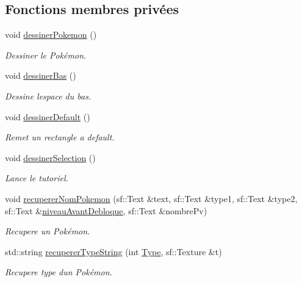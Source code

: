 \subsection*{Fonctions membres privées}
\begin{DoxyCompactItemize}
\item 
void \hyperlink{class_s_f_m_l_pokedex_a7693d7d78e637f1839f0459985cb59e3}{dessiner\+Pokemon} ()
\begin{DoxyCompactList}\small\item\em Dessiner le Pokémon. \end{DoxyCompactList}\item 
void \hyperlink{class_s_f_m_l_pokedex_a9760b492343dc3c07d49ec86f2160a95}{dessiner\+Bas} ()
\begin{DoxyCompactList}\small\item\em Dessine l\textquotesingle{}espace du bas. \end{DoxyCompactList}\item 
void \hyperlink{class_s_f_m_l_pokedex_ae5f87a7a8a5cb0e6d151f15646d7e4af}{dessiner\+Default} ()
\begin{DoxyCompactList}\small\item\em Remet un rectangle a default. \end{DoxyCompactList}\item 
void \hyperlink{class_s_f_m_l_pokedex_a4cec507ffcc5916c32c8b14211c991fa}{dessiner\+Selection} ()
\begin{DoxyCompactList}\small\item\em Lance le tutoriel. \end{DoxyCompactList}\item 
void \hyperlink{class_s_f_m_l_pokedex_a3729d8001348235c5ad12245cdb61b28}{recuperer\+Nom\+Pokemon} (sf\+::\+Text \&text, sf\+::\+Text \&type1, sf\+::\+Text \&type2, sf\+::\+Text \&\hyperlink{class_s_f_m_l_pokedex_a418ba384fed946ddca305937083441e8}{niveau\+Avant\+Debloque}, sf\+::\+Text \&nombre\+Pv)
\begin{DoxyCompactList}\small\item\em Recupere un Pokémon. \end{DoxyCompactList}\item 
std\+::string \hyperlink{class_s_f_m_l_pokedex_a16ac63df885664b02c66b06dd1cfa9ef}{recuperer\+Type\+String} (int \hyperlink{_attaque_8h_a1d1cfd8ffb84e947f82999c682b666a7}{Type}, sf\+::\+Texture \&t)
\begin{DoxyCompactList}\small\item\em Recupere type d\textquotesingle{}un Pokémon. \end{DoxyCompactList}\item 

\end{DoxyCompactItemize}
